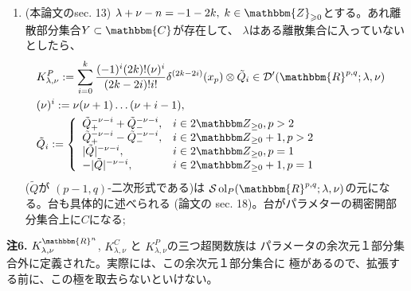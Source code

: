 \documentclass[a4paper]{article} %
\newcommand{\assign}{:=}
\newcommand{\tmop}[1]{\ensuremath{\operatorname{#1}}}
\newcommand{\tmtextbf}[1]{{\bfseries{#1}}}
\begin{document}
{\begin{enumerate}
 \item (本論文のsec. 13) $\lambda + \nu - n = - 1 - 2 k, \; k \in
 \mathbbm{Z}_{\geqslant 0}$とする。あれ離散部分集合$Y\subset\mathbbm{C}$が存在して、
 $\lambda$はある離散集合に入っていないとしたら、
 \begin{eqnarray}
 & K^P_{\lambda, \nu} \assign \sum_{i = 0}^k \frac{(- 1)^i (2 k) !
 (\nu)^i}{(2 k - 2 i) !i!} \delta^{(2 k - 2 i)} (x_p) \otimes \tilde{Q}_i
 \in \mathcal{D}' ( \mathbbm{R}^{p, q} ; \lambda, \nu) & \nonumber\\
 & (\nu)^i \assign \nu (\nu + 1) \ldots (\nu + i - 1), & \nonumber\\
 & \tilde{Q}_i \assign \left\{ \begin{array}{ll}
 \tilde{Q}_+^{- \nu - i} + \tilde{Q}_-^{- \nu - i}, & i \in 2 \Z_{\ge 0},
 p > 2\\
 \tilde{Q}_+^{- \nu - i} - \tilde{Q}_-^{- \nu - i}, & i \in 2 \Z_{\ge 0}
 + 1, p > 2\\
 | \tilde{Q} |^{- \nu - i}, & i \in 2 \Z_{\ge 0}, p = 1\\
 - | \tilde{Q} |^{- \nu - i}, & i \in 2 \Z_{\ge 0} + 1, p = 1
 \end{array} \right. & \nonumber
 \end{eqnarray}
 ($\tilde{Q}$が $( p - 1, q)$-二次形式である)は
 $\mathcal{S} \tmop{ol}_P ( \mathbbm{R}^{p, q} ; \lambda, \nu)$の元になる。台も具体的に述べられる
 (論文の sec. 18)。台がパラメターの稠密開部分集合上に$C$になる;
\end{enumerate}}{\hspace*{\fill}}{\medskip}

{\noindent}\tmtextbf{注\textbf{6}.} $K_{\lambda,
\nu}^{\mathbbm{R}^n}$, $K_{\lambda, \nu}^C$ と $K_{\lambda, \nu}^P$の三つ超関数族は
パラメータの余次元１部分集合外に定義された。実際には、この余次元１部分集合に
極があるので、拡張する前に、この極を取去らないといけない。
\end{document}
